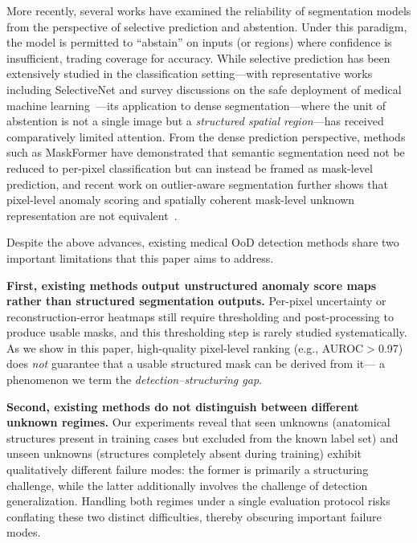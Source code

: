 \documentclass[3p,twocolumn,authoryear]{elsarticle}
\begin{document}
More recently, several works have examined the reliability of segmentation models
from the perspective of selective prediction and abstention.
Under this paradigm, the model is permitted to ``abstain'' on inputs (or regions)
where confidence is insufficient, trading coverage for accuracy.
While selective prediction has been extensively studied in the classification
setting---with representative works including SelectiveNet and survey discussions
on the safe deployment of medical machine
learning~\cite{geifman2019selectivenetdeep,kompa2021secondopinion}---its application
to dense segmentation---where the unit of abstention is not a single image but a
\emph{structured spatial region}---has received comparatively limited attention.
From the dense prediction perspective, methods such as MaskFormer have demonstrated
that semantic segmentation need not be reduced to per-pixel classification but can
instead be framed as mask-level prediction, and recent work on outlier-aware
segmentation further shows that pixel-level anomaly scoring and spatially coherent
mask-level unknown representation are not
equivalent~\cite{cheng2021perpixel,grcic2023advantagesmask}.

Despite the above advances, existing medical OoD detection methods share two important
limitations that this paper aims to address.

\textbf{First, existing methods output unstructured anomaly score maps rather than
structured segmentation outputs.}
Per-pixel uncertainty or reconstruction-error heatmaps still require thresholding and
post-processing to produce usable masks, and this thresholding step is rarely studied
systematically.
As we show in this paper, high-quality pixel-level ranking (e.g., AUROC$>$0.97)
does \emph{not} guarantee that a usable structured mask can be derived from it---
a phenomenon we term the \emph{detection--structuring gap}.

\textbf{Second, existing methods do not distinguish between different unknown regimes.}
Our experiments reveal that seen unknowns (anatomical structures present in training
cases but excluded from the known label set) and unseen unknowns (structures completely
absent during training) exhibit qualitatively different failure modes:
the former is primarily a structuring challenge, while the latter additionally involves
the challenge of detection generalization.
Handling both regimes under a single evaluation protocol risks conflating these two
distinct difficulties, thereby obscuring important failure modes.
\end{document}
